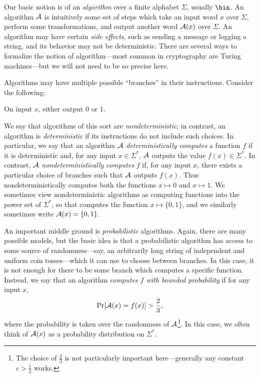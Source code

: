 Our basic notion is of an \emph{algorithm} over a finite alphabet $\Sigma$,
usually $\bin$. An algorithm $\mathcal{A}$ is intuitively some set of steps which take
an input word $x$ over $\Sigma$, perform some transformations, and output
another word $\mathcal{A}(x)$ over $\Sigma$. An algorithm may have certain \emph{side
effects}, such as sending a message or logging a string, and its behavior may
not be deterministic. There are several ways to formalize the notion of
algorithm---most common in cryptography are Turing machines---but we will not
need to be so precise here.

Algorithms may have multiple possible ``branches'' in their instructions.
Consider the following:

\begin{_algo}\label{alg:nondeterministic}
  On input $x$, either output $0$ or $1$.
\end{_algo}

We say that algorithms of this sort are \emph{nondeterministic}; in contrast, an
algorithm is \emph{deterministic} if its instructions do not include such
choices. In particular, we say that an algorithm $\mathcal{A}$ \emph{deterministically
computes} a function $f$ if it is deterministic and, for any input $x\in
\Sigma^*$, $\mathcal{A}$ outputs the value $f(x)\in\Sigma^*$. In contrast, $\mathcal{A}$
\emph{nondeterministically computes} $f$ if, for any input $x$, there exists a
particular choice of branches such that $\mathcal{A}$ outputs $f(x)$. Thus
 nondeterministically computes both
the functions $x\mapsto 0$ and $x\mapsto 1$. We sometimes view nondeterministic
algorithms as computing functions into the power set of $\Sigma^*$, so that
 computes the function $x\mapsto\{0,
1\}$, and we similarly sometimes write $\mathcal{A}(x) = \{0, 1\}$.

An important middle ground is \emph{probabilistic} algorithms. Again, there are
many possible models, but the basic idea is that a probabilistic algorithm has
access to some source of randomness---say, an arbitrarily long string of
independent and uniform coin tosses---which it can use to choose between
branches. In this case, it is not enough for there to be some branch which
computes a specific function. Instead, we say that an algorithm \emph{computes
$f$ with bounded probability} if for any input $x$, \[
  \Pr[\mathcal{A}(x) = f(x)] > \frac{2}{3},
\]where the probability is taken over the randomness of $\mathcal{A}$\footnote{The
  choice of $\frac{2}{3}$ is not particularly important here---generally any constant
$c>\frac{1}{2}$ works.}. In this case, we
often think of $\mathcal{A}(x)$ as a probability distribution on $\Sigma^*$.

